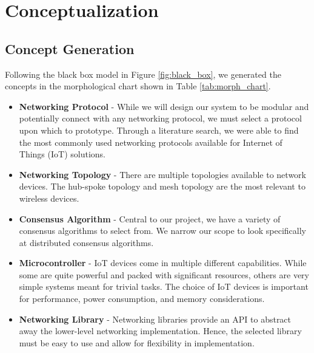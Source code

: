 \section{Conceptualization}
\subsection{Concept Generation}

Following the black box model in Figure \ref{fig:black_box}, we generated the concepts in the morphological chart shown in Table \ref{tab:morph_chart}.

\begin{itemize}
	\item \textbf{Networking Protocol} - While we will design our system to be modular and potentially connect with any networking protocol, we must select a protocol upon which to prototype. Through a literature search, we were able to find the most commonly used networking protocols available for Internet of Things (IoT) solutions.
	\item \textbf{Networking Topology} - There are multiple topologies available to network devices. The hub-spoke topology and mesh topology are the most relevant to wireless devices.
	\item \textbf{Consensus Algorithm} - Central to our project, we have a variety of consensus algorithms to select from. We narrow our scope to look specifically at distributed consensus algorithms. 
	\item \textbf{Microcontroller} - IoT devices come in multiple different capabilities. While some are quite powerful and packed with significant resources, others are very simple systems meant for trivial tasks. The choice of IoT devices is important for performance, power consumption, and memory considerations.
	\item \textbf{Networking Library} - Networking libraries provide an API to abstract away the lower-level networking implementation. Hence, the selected library must be easy to use and allow for flexibility in implementation. 
\end{itemize}


